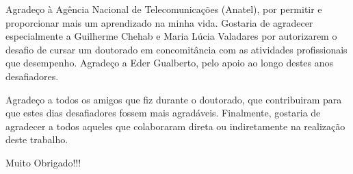 \documentclass[en, oneside, onehalfspacing]{risethesis}
\begin{document}
Agradeço à Agência Nacional de Telecomunicações (Anatel), por permitir e proporcionar mais um aprendizado na minha vida. Gostaria de agradecer especialmente a Guilherme Chehab e Maria Lúcia Valadares por autorizarem o desafio de cursar um doutorado em concomitância com as atividades profissionais que desempenho. Agradeço a Eder Gualberto, pelo apoio ao longo destes anos desafiadores.

Agradeço a todos os amigos que fiz durante o doutorado, que contribuiram para que estes dias desafiadores fossem mais agradáveis. Finalmente, gostaria de agradecer a todos aqueles que colaboraram direta ou indiretamente na realização deste trabalho.

Muito Obrigado!!!

\resumo


\abstract


\tableofcontents

\makeatletter
\renewcommand{\@thesubfigure}{\thesubfigure:\hskip\subfiglabelskip}
\makeatother
\setcounter{lofdepth}{2}

\listoffigures
\listoftables


\mainmatter
	






\appendix






\clearpage
\addappheadtotoc
\end{document}
